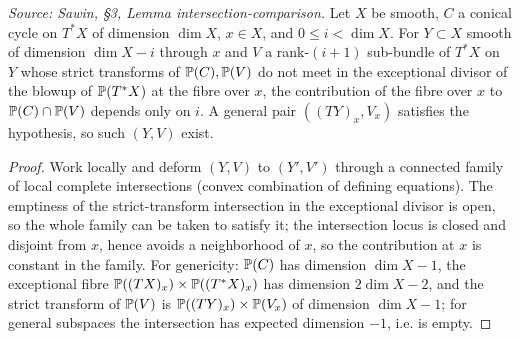 \begin{lemma}
  \label{lem:sawin_intersection_comparison}
  \textit{Source: Sawin, §3, Lemma intersection-comparison.}
  Let $X$ be smooth, $C$ a conical cycle on $T^*X$ of dimension $\dim X$, $x\in
  X$, and $0\le i<\dim X$.  For $Y\subset X$ smooth of dimension $\dim X-i$
  through $x$ and $V$ a rank-$(i+1)$ sub-bundle of $T^*X$ on $Y$ whose strict
  transforms of $\mathbb{P}(C),\mathbb{P}(V)$ do not meet in the exceptional divisor of the
  blowup of $\mathbb{P}(T^*X)$ at the fibre over $x$, the contribution of the fibre over
  $x$ to $\mathbb{P}(C)\cap\mathbb{P}(V)$ depends only on $i$.  A general pair $((TY)_x,V_x)$
  satisfies the hypothesis, so such $(Y,V)$ exist.
\end{lemma}
\begin{proof}
  Work locally and deform $(Y,V)$ to $(Y',V')$ through a connected family of
  local complete intersections (convex combination of defining equations).  The
  emptiness of the strict-transform intersection in the exceptional divisor is
  open, so the whole family can be taken to satisfy it; the intersection locus is
  closed and disjoint from $x$, hence avoids a neighborhood of $x$, so the
  contribution at $x$ is constant in the family.  For genericity: $\mathbb{P}(C)$ has
  dimension $\dim X-1$, the exceptional fibre $\mathbb{P}((TX)_x)\times\mathbb{P}((T^*X)_x)$ has
  dimension $2\dim X-2$, and the strict transform of $\mathbb{P}(V)$ is
  $\mathbb{P}((TY)_x)\times\mathbb{P}(V_x)$ of dimension $\dim X-1$; for general subspaces the
  intersection has expected dimension $-1$, i.e. is empty.
\end{proof}

